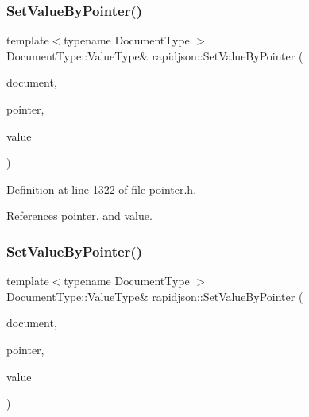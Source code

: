 \subsubsection{\texorpdfstring{SetValueByPointer()}{SetValueByPointer()}\hspace{0.1cm}{\footnotesize\ttfamily [8/12]}}
{\footnotesize\ttfamily template$<$typename Document\+Type $>$ \\
Document\+Type\+::\+Value\+Type\& rapidjson\+::\+Set\+Value\+By\+Pointer (\begin{DoxyParamCaption}\item[{Document\+Type \&}]{document,  }\item[{const \mbox{\hyperlink{classrapidjson_1_1_generic_pointer}{Generic\+Pointer}}$<$ typename Document\+Type\+::\+Value\+Type $>$ \&}]{pointer,  }\item[{const typename Document\+Type\+::\+Value\+Type \&}]{value }\end{DoxyParamCaption})}



Definition at line 1322 of file pointer.\+h.


\begin{DoxyCode}{0}

\end{DoxyCode}


References pointer, and value.

\mbox{\label{namespacerapidjson_ae1ed433d2762ea314c3936e0e7b3259b}} 
\subsubsection{\texorpdfstring{SetValueByPointer()}{SetValueByPointer()}\hspace{0.1cm}{\footnotesize\ttfamily [9/12]}}
{\footnotesize\ttfamily template$<$typename Document\+Type $>$ \\
Document\+Type\+::\+Value\+Type\& rapidjson\+::\+Set\+Value\+By\+Pointer (\begin{DoxyParamCaption}\item[{Document\+Type \&}]{document,  }\item[{const \mbox{\hyperlink{classrapidjson_1_1_generic_pointer}{Generic\+Pointer}}$<$ typename Document\+Type\+::\+Value\+Type $>$ \&}]{pointer,  }\item[{const typename Document\+Type\+::\+Ch $\ast$}]{value }\end{DoxyParamCaption})}



